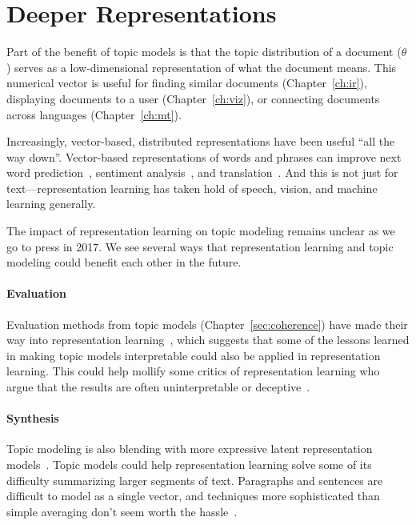 \section{Deeper Representations}

Part of the benefit of topic models is that the topic distribution of
a document ($\theta$) serves as a low-dimensional representation of
what the document means.  This numerical vector is useful for finding
similar documents (Chapter~\ref{ch:ir}), displaying documents to a user
(Chapter~\ref{ch:viz}), or connecting documents across languages
(Chapter~\ref{ch:mt}).

 Increasingly, vector-based,
distributed representations have been useful ``all the way down''.
Vector-based representations of words and phrases can improve next
word prediction~\citep{bengio-03}, sentiment
analysis~\citep{socher-12}, and translation~\citep{devlin-14}.  And
this is not just for text---representation learning has taken hold of
speech, vision, and machine learning generally.

The impact of representation learning on topic modeling remains
unclear as we go to press in 2017.  We see several ways that
representation learning and topic modeling could benefit each other in
the future.

\paragraph{Evaluation}

Evaluation methods from topic models (Chapter~\ref{sec:coherence})
have made their way into representation
learning~\citep{schnabel-15,iyyer-16}, which suggests that some of the
lessons learned in making topic models interpretable could also be
applied in representation learning.  This could help mollify some
critics of representation learning who argue that the results are
often uninterpretable or deceptive~\citep{szegedy-14}.

\paragraph{Synthesis}

Topic modeling is also blending with more expressive latent
representation models~\citep{ranganath-15}.  Topic models could help
representation learning solve some of its difficulty summarizing
larger segments of text.  Paragraphs and sentences are difficult to
model as a single vector, and techniques more sophisticated than
simple averaging don't seem worth the hassle~\citep{iyyer-15}.

